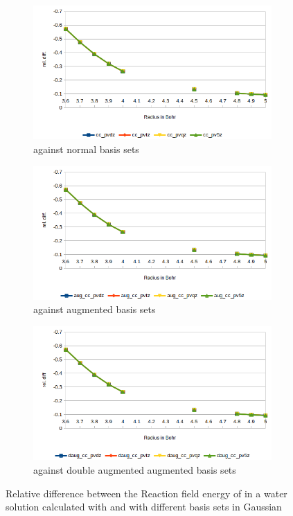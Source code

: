 \documentclass[../master_thesis.tex]{subfiles}
\begin{document}
\begin{figure}[h!]
  \centering
  \begin{subfigure}[b]{0.75\linewidth}
    \includegraphics[width=\linewidth]{img/nopreldiff.png}
    \caption{\mrchem against normal basis sets}
  \end{subfigure}
  \begin{subfigure}[b]{0.75\linewidth}
    \includegraphics[width=\linewidth]{img/nopaugreldiff.png}
    \caption{\mrchem against augmented basis sets}
  \end{subfigure}
  \begin{subfigure}[b]{0.75\linewidth}
    \includegraphics[width=\linewidth]{img/nopdaugreldiff.png}
    \caption{\mrchem against double augmented augmented basis sets}
  \end{subfigure}
  \caption[Relative difference between methods for ]{Relative difference between the Reaction field energy of  in a water solution calculated with \mrchem
  and with different basis sets in Gaussian}
  \label{fig:nopreldiff}
\end{figure}
\end{document}

